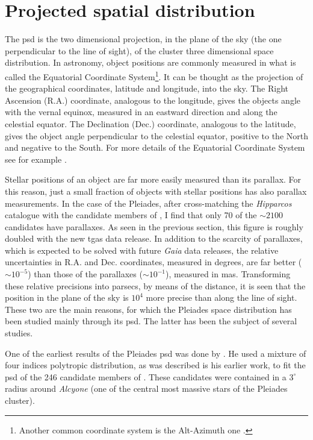 \section{Projected spatial distribution}
\label{sect:PSD}
The \gls{psd} is the two dimensional projection, in the plane of the sky (the one perpendicular to the line of sight), of the cluster three dimensional space distribution. In astronomy, object positions are commonly measured in what is called the Equatorial Coordinate System\footnote{Another common coordinate system is the Alt-Azimuth one \cite[see][]{Smart1977}.}. It can be thought as the projection of the geographical coordinates, latitude and longitude, into the sky. The Right Ascension (R.A.) coordinate, analogous to the longitude, gives the objects angle with the vernal equinox, measured in an eastward direction and along the celestial equator. The Declination (Dec.) coordinate, analogous to the latitude, gives the object angle perpendicular to the celestial equator, positive to the North and negative to the South. For more details of the Equatorial Coordinate System see for example \citet{Smart1977}. 

{Stellar positions of an object are far more easily measured than its parallax. For this reason, just a small fraction of objects with stellar positions has also parallax measurements. In the case of the Pleiades, after cross-matching the \emph{Hipparcos} catalogue \citep{1997A&A...323L..49P} with the candidate members of \citet{Bouy2015}, I find that only 70 of the $\sim2100$ candidates have parallaxes. As seen in the previous section, this figure is roughly doubled with the new \gls{tgas} \citep{2016A&A...595A...1G} data release. In addition to the scarcity of parallaxes, which is expected to be solved with future \emph{Gaia} data releases, the relative uncertainties in R.A. and Dec. coordinates, measured in degrees, are far better ($\sim 10^{-5}$) than those of the parallaxes ($\sim10^{-1}$), measured in mas. Transforming these relative precisions into parsecs, by means of the distance, it is seen that the position in the plane of the sky is $10^4$ more precise than along the line of sight.  These two are the main reasons, for which the Pleiades space distribution has been studied mainly through its \gls{psd}. The latter has been the subject of several studies. }

One of the earliest results of the Pleiades \gls{psd} was done by \citet{Limber1962}. He used a mixture of four indices polytropic distribution, as was described is his earlier \citet{Limber1961} work, to fit the \gls{psd} of the 246 candidate members of \citet{Trumpler1921}. These candidates were contained in a $3^{\circ}$ radius around \emph{Alcyone} (one of the central most massive stars of the Pleiades cluster). 

